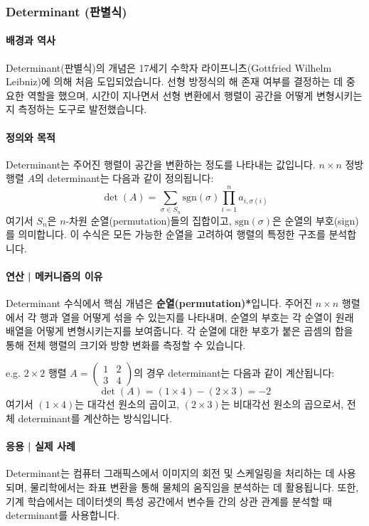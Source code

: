 \subsubsection{Determinant (판별식)}

\paragraph{배경과 역사}
Determinant(판별식)의 개념은 17세기 수학자 라이프니츠(Gottfried Wilhelm Leibniz)에 의해 처음 도입되었습니다. 선형 방정식의 해 존재 여부를 결정하는 데 중요한 역할을 했으며, 시간이 지나면서 선형 변환에서 행렬이 공간을 어떻게 변형시키는지 측정하는 도구로 발전했습니다.

\paragraph{정의와 목적}
Determinant는 주어진 행렬이 공간을 변환하는 정도를 나타내는 값입니다. \(n \times n\) 정방행렬 \(A\)의 determinant는 다음과 같이 정의됩니다:
\[
  \det(A) = \sum_{\sigma \in S_n} \text{sgn}(\sigma) \prod_{i=1}^n a_{i, \sigma(i)}
\]
여기서 \(S_n\)은 \(n\)-차원 순열(permutation)들의 집합이고, \(\text{sgn}(\sigma)\)은 순열의 부호(sign)를 의미합니다. 이 수식은 모든 가능한 순열을 고려하여 행렬의 특정한 구조를 분석합니다.

\paragraph{연산 | 메커니즘의 이유}
Determinant 수식에서 핵심 개념은 \textbf{순열(permutation)*}입니다. 주어진 \(n \times n\) 행렬에서 각 행과 열을 어떻게 섞을 수 있는지를 나타내며, 순열의 부호는 각 순열이 원래 배열을 어떻게 변형시키는지를 보여줍니다. 각 순열에 대한 부호가 붙은 곱셈의 합을 통해 전체 행렬의 크기와 방향 변화를 측정할 수 있습니다.

\vspace{1\baselineskip}
\noindent {} e.g.
\(2 \times 2\) 행렬 \(A = \begin{pmatrix} 1 & 2 \\ 3 & 4 \end{pmatrix}\)의 경우 determinant는 다음과 같이 계산됩니다:
\[
  \det(A) = (1 \times 4) - (2 \times 3) = -2
\]
여기서 \( (1 \times 4) \)는 대각선 원소의 곱이고, \( (2 \times 3) \)는 비대각선 원소의 곱으로서, 전체 determinant를 계산하는 방식입니다.

\paragraph{응용 | 실제 사례}
Determinant는 컴퓨터 그래픽스에서 이미지의 회전 및 스케일링을 처리하는 데 사용되며, 물리학에서는 좌표 변환을 통해 물체의 움직임을 분석하는 데 활용됩니다. 또한, 기계 학습에서는 데이터셋의 특성 공간에서 변수들 간의 상관 관계를 분석할 때 determinant를 사용합니다.
